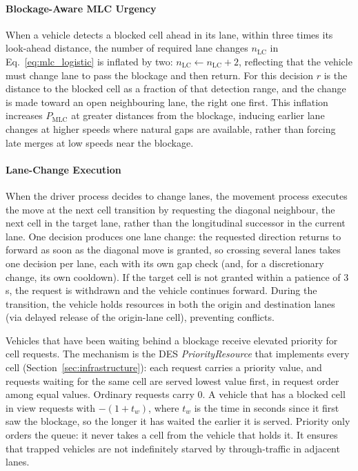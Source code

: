 \documentclass[review,number]{elsarticle}
\begin{document}
\paragraph{Blockage-Aware MLC Urgency}
When a vehicle detects a blocked cell ahead in its lane, within three times its look-ahead distance, the number of required lane changes $n_{\text{LC}}$ in Eq.~\eqref{eq:mlc_logistic} is inflated by two: $n_{\text{LC}} \leftarrow n_{\text{LC}} + 2$, reflecting that the vehicle must change lane to pass the blockage and then return. For this decision $r$ is the distance to the blocked cell as a fraction of that detection range, and the change is made toward an open neighbouring lane, the right one first. This inflation increases $P_{\text{MLC}}$ at greater distances from the blockage, inducing earlier lane changes at higher speeds where natural gaps are available, rather than forcing late merges at low speeds near the blockage.

\paragraph{Lane-Change Execution}
When the driver process decides to change lanes, the movement process executes the move at the next cell transition by requesting the diagonal neighbour, the next cell in the target lane, rather than the longitudinal successor in the current lane. One decision produces one lane change: the requested direction returns to forward as soon as the diagonal move is granted, so crossing several lanes takes one decision per lane, each with its own gap check (and, for a discretionary change, its own cooldown). If the target cell is not granted within a patience of 3\,s, the request is withdrawn and the vehicle continues forward. During the transition, the vehicle holds resources in both the origin and destination lanes (via delayed release of the origin-lane cell), preventing conflicts.

Vehicles that have been waiting behind a blockage receive elevated priority for cell requests. The mechanism is the DES \emph{PriorityResource} that implements every cell (Section~\ref{sec:infrastructure}): each request carries a priority value, and requests waiting for the same cell are served lowest value first, in request order among equal values. Ordinary requests carry 0. A vehicle that has a blocked cell in view requests with $-(1 + t_w)$, where $t_w$ is the time in seconds since it first saw the blockage, so the longer it has waited the earlier it is served. Priority only orders the queue: it never takes a cell from the vehicle that holds it. It ensures that trapped vehicles are not indefinitely starved by through-traffic in adjacent lanes.
\end{document}
